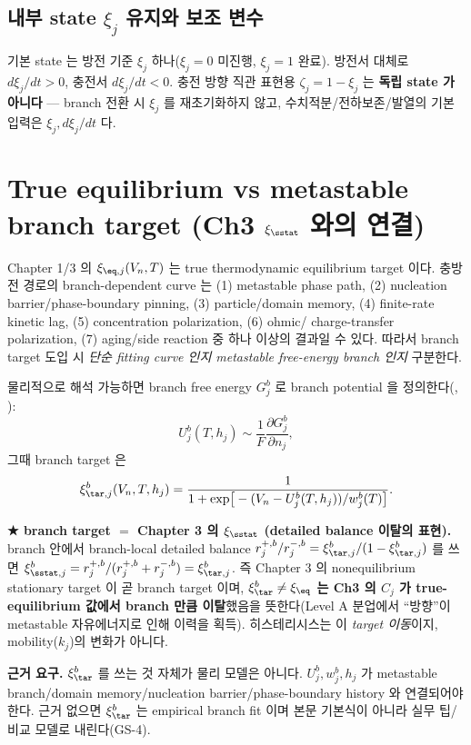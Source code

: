\subsection{내부 state $\xi_j$ 유지와 보조 변수}
기본 state 는 방전 기준 $\xi_j$ 하나($\xi_j=0$ 미진행, $\xi_j=1$ 완료). 방전서 대체로 $d\xi_j/dt>0$, 충전서
$d\xi_j/dt<0$. 충전 방향 직관 표현용 $\zeta_j=1-\xi_j$ 는 \textbf{독립 state 가 아니다} — branch 전환 시
$\xi_j$ 를 재초기화하지 않고, 수치적분/전하보존/발열의 기본 입력은 $\xi_j,d\xi_j/dt$ 다.

\section{True equilibrium vs metastable branch target (Ch3 $\xi_{\sstat}$ 와의 연결)}\label{sec:ch5_branch}
Chapter 1/3 의 $\xi_{\eq,j}(V_n,T)$ 는 true thermodynamic equilibrium target 이다. 충방전 경로의
branch-dependent curve 는 (1) metastable phase path, (2) nucleation barrier/phase-boundary pinning,
(3) particle/domain memory, (4) finite-rate kinetic lag, (5) concentration polarization, (6) ohmic/
charge-transfer polarization, (7) aging/side reaction 중 하나 이상의 결과일 수 있다. 따라서 branch target
도입 시 \emph{단순 fitting curve 인지 metastable free-energy branch 인지} 구분한다.

물리적으로 해석 가능하면 branch free energy $G_j^b$ 로 branch potential 을 정의한다(\cite{dreyer2010,sethna1993}, ):
\begin{equation}
U_j^b(T,h_j)\sim\frac{1}{F}\frac{\partial G_j^b}{\partial n_j},
\label{eq:ch5_branch_potential}
\end{equation}
그때 branch target 은
\begin{equation}
\xi_{\tar,j}^b(V_n,T,h_j)=\frac{1}{1+\exp\!\big[-(V_n-U_j^b(T,h_j))/w_j^b(T)\big]}.
\label{eq:ch5_branch_target}
\end{equation}
\begin{keybox}
\textbf{★ branch target $=$ Chapter 3 의 $\xi_{\sstat}$ (detailed balance 이탈의 표현).} branch 안에서
branch-local detailed balance $r_j^{+,b}/r_j^{-,b}=\xi_{\tar,j}^b/(1-\xi_{\tar,j}^b)$ 를 쓰면
$\xi_{\sstat,j}^b=r_j^{+,b}/(r_j^{+,b}+r_j^{-,b})=\xi_{\tar,j}^b$. 즉 Chapter 3 의 nonequilibrium stationary
target 이 곧 branch target 이며, \textbf{$\xi_{\tar}^b\ne\xi_{\eq}$ 는 Ch3 의 $C_j$ 가 true-equilibrium
값에서 branch 만큼 이탈}했음을 뜻한다(Level A 분업에서 ``방향''이 metastable 자유에너지로 인해 이력을
획득). 히스테리시스는 이 \emph{target 이동}이지, mobility($k_j$)의 변화가 아니다.
\end{keybox}
\begin{boundbox}
\textbf{근거 요구.} $\xi_{\tar}^b$ 를 쓰는 것 자체가 물리 모델은 아니다. $U_j^b,w_j^b,h_j$ 가 metastable
branch/domain memory/nucleation barrier/phase-boundary history 와 연결되어야 한다. 근거 없으면 $\xi_{\tar}^b$
는 empirical branch fit 이며 본문 기본식이 아니라 실무 팁/비교 모델로 내린다(GS-4).
\end{boundbox}

